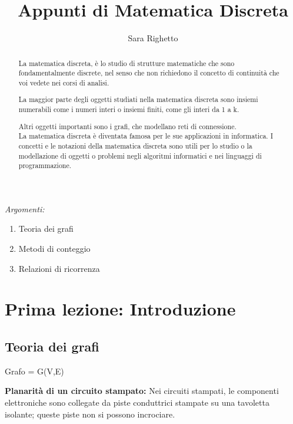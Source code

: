 \documentclass[12pt,a4paper]{article}
\begin{document}
    \author{Sara Righetto}
    \title{Appunti di Matematica Discreta}

    \maketitle

    \newpage
    \tableofcontents %

    \newpage

    \begin{abstract} 
        La matematica discreta, è lo studio di strutture matematiche che sono fondamentalmente discrete, nel senso che non
    richiedono il concetto di continuità che voi vedete nei corsi di analisi. \par
    La maggior parte degli oggetti studiati nella matematica discreta sono insiemi numerabili come i numeri interi o
    insiemi finiti, come gli interi da 1 a k. \par
    Altri oggetti importanti sono i grafi, che modellano reti di connessione. \\

        La matematica discreta è diventata famosa per le sue applicazioni in informatica. I concetti e le notazioni della matematica discreta sono utili per lo studio o la modellazione di oggetti o problemi negli algoritmi informatici e nei linguaggi di programmazione.
    \end{abstract}

\begin{center}
    \textit{Argomenti:}
    \begin{enumerate}
        \item Teoria dei grafi 
        \item Metodi di conteggio
        \item Relazioni di ricorrenza
    \end{enumerate}
\end{center}

    \newpage


    \section{Prima lezione: Introduzione}

    \subsection{Teoria dei grafi}
        Grafo = G(V,E) \par
        \textbf{Planarità di un circuito stampato:} 
Nei circuiti stampati, le componenti elettroniche sono collegate da piste conduttrici stampate su una tavoletta
isolante; queste piste non si possono incrociare.\\
\end{document}
